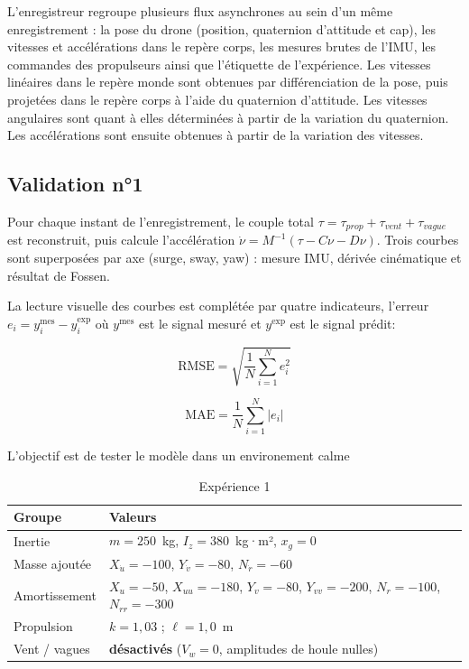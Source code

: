 \documentclass{rapportEILCO}
\begin{document}
	L'enregistreur regroupe plusieurs flux asynchrones au sein d'un même enregistrement : la pose du drone (position, quaternion d'attitude et cap), les vitesses et accélérations dans le repère corps, les mesures brutes de l'IMU, les commandes des propulseurs ainsi que l'étiquette de l'expérience. Les vitesses linéaires dans le repère monde sont obtenues par différenciation de la pose, puis projetées dans le repère corps à l'aide du quaternion d'attitude. Les vitesses angulaires sont quant à elles déterminées à partir de la variation du quaternion. Les accélérations sont ensuite obtenues à partir de la variation des vitesses.
	
	\subsection{Validation n°1}
	\label{sec:exp_2}
	Pour chaque instant de l'enregistrement, le couple total $\tau = \tau_{prop} + \tau_{vent} + \tau_{vague}$ est reconstruit, puis calcule l'accélération $\dot\nu = M^{-1}(\tau - C\nu - D\nu)$. Trois courbes sont superposées par axe (surge, sway, yaw) : mesure IMU, dérivée cinématique et résultat de Fossen.
	
	
	La lecture visuelle des courbes est complétée par
	quatre indicateurs, l'erreur $e_i = y^{\mathrm{mes}}_i -
	y^{\mathrm{exp}}_i$ où $y^{\mathrm{mes}}$ est le signal mesuré et $y^{\mathrm{exp}}$ est le signal prédit:
	
	\begin{equation}
		\mathrm{RMSE} = \sqrt{\frac{1}{N}\sum_{i=1}^{N} e_i^{2}}
		\label{eq:rmse}
	\end{equation}
	
	\begin{equation}
		\mathrm{MAE} = \frac{1}{N}\sum_{i=1}^{N} |e_i|
		\label{eq:mae}
	\end{equation}
	
	L'objectif est de tester le modèle dans un environement calme
	\begin{table}[H]
		\centering
		\caption{Expérience 1}
		\label{tab:params_exp_2}
		\begin{tabular}{ll}
			\toprule
			\textbf{Groupe} & \textbf{Valeurs} \\
			\midrule
			Inertie & $m = 250$~kg, $I_z = 380$~kg·m², $x_g = 0$ \\
			Masse ajoutée & $X_{\dot u} = -100$, $Y_{\dot v} = -80$, $N_{\dot r} = -60$ \\
			Amortissement & $X_u = -50$, $X_{uu} = -180$, $Y_v = -80$, $Y_{vv} = -200$,
			$N_r = -100$, $N_{rr} = -300$ \\
			Propulsion & $k = 1,03$ ; $\ell = 1,0$~m \\
			Vent / vagues & \textbf{désactivés} ($V_w = 0$, amplitudes de houle nulles) \\
			\bottomrule
		\end{tabular}
	\end{table}
	
\end{document}
